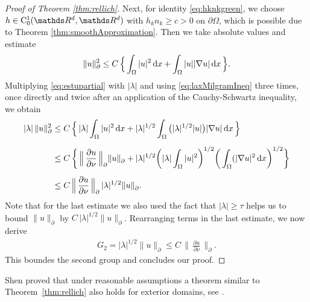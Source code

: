 \begin{proof}[Proof of Theorem \ref{thm:rellich}]
  Next, for identity \eqref{eq:hknkgreen}, we choose $h \in \CC_0^1(\R^d, \R^d)$ with $h_k n_k \geq c > 0$ on $\partial\Omega$, which is possible due to Theorem \ref{thm:smoothApproximation}.
  Then we take absolute values and estimate
  \begin{align}
    \label{eq:estupartial}
    \|u\|_\partial^2 \leq C\, \Big\{ \int_\Omega |u|^2 \, {\operatorname{d}\!{x}} +  \int_\Omega |u| |\nabla u| \, {\operatorname{d}\!{x}}\, \Big\}.
  \end{align}
  Multiplying  \eqref{eq:estupartial} with $|\lambda|$ and using \eqref{eq:laxMilgramIneq} three times, once directly and twice after an application of the Cauchy-Schwartz inequality, we obtain 
  \begin{align*}
    |\lambda|\, \|u\|_\partial^2 
    &\leq C\, \Big\{\, |\lambda| \int_\Omega |u|^2 \, {\operatorname{d}\!{x}} + |\lambda|^{1/2}  \int_\Omega \big(|\lambda|^{1/2} |u| \big) |\nabla u| \, {\operatorname{d}\!{x}}\, \Big\} \nonumber\\[0.5em]
    &\leq C\, \bigg\{ \, \Big\|\, \frac{\partial u}{\partial \nu} \, \Big\|^{}_\partial \|u\|^{}_\partial + |\lambda|^{1/2} \bigg( |\lambda|\int_\Omega  |u|^2 \bigg)^{1/2} \bigg( \int_\Omega (|\nabla u|^2 \, {\operatorname{d}\!{x}} \bigg)^{1/2} \bigg\} \\[0.5em]
    &\leq C\, \Big\|\,\frac{\partial u}{\partial \nu} \, \Big\|^{}_\partial \, |\lambda|^{1/2}  \|u\|^{}_\partial.
  \end{align*}
  Note that for the last estimate we also used the fact that $|\lambda| \geq \tau$ helps us to bound $\|u\|^{}_\partial$ by $C\, |\lambda|^{1/2} \|u\|^{}_\partial$.
  Rearranging terms in the last estimate, we now derive
  \begin{align}
    \label{eq:lambda12u}
    G_2
    = |\lambda|^{1/2} \|  u\|^{}_\partial 
    \leq C\, \Big\|\, \frac{\partial u}{\partial \nu} \,\Big\|^{}_\partial.
  \end{align}
  This boundes the second group and concludes our proof.
\end{proof}

Shen proved that under reasonable assumptions a theorem similar to Theorem~\ref{thm:rellich} also holds for exterior domains, see \cite[Thm. 4.6]{Shen2012}.

